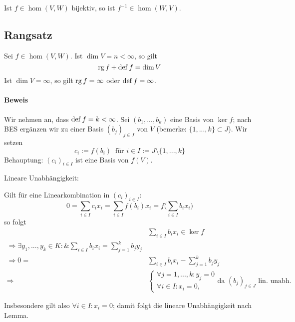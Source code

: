  		Ist $ f\in \hom (V,W) $ bijektiv, so ist $ f^{-1}\in \hom (W,V) $.

 \subsection{Rangsatz}
 	\begin{Satz}[Rangsatz]
 		Sei $ f\in \hom (V,W) $. Ist $ \dim V = n < \infty $,  so gilt
 		\[
 			\operatorname{rg} f + \operatorname{def} f = \dim V
 		\]
 		Ist $ \dim V = \infty $, so gilt $ \operatorname{rg} f = \infty $ oder $ \operatorname{def} f = \infty $.
 	\end{Satz}

 	\paragraph{Beweis}
 		Wir nehmen an, dass $ \operatorname{def} f = k < \infty $.
 		Sei $ (b_1,...,b_k) $ eine Basis von $ \ker f $;
 		nach BES ergänzen wir zu einer Basis $ (b_j)_{j\in J} $ von $ V $ (bemerke: $ \{1,...,k\}\subset J $).
 		Wir setzen
 		\[
 			c_i:=f(b_i)\ \text{ für } i\in I:=J\setminus \{1,...,k\}
 		\]
 		Behauptung: $(c_i)_{i\in I}$ ist eine Basis von $f(V)$.

 		Lineare Unabhängigkeit:
 		\begin{addmargin}[25pt]{0pt}
 			Gilt für eine Linearkombination in $(c_i)_{i\in I}$:
 			\[
 				0=\sum_{i\in I}c_ix_i = \sum_{i\in I}f(b_i)x_i = f\Big(\sum_{i\in I}b_ix_i\Big)
 			\]
 			so folgt
 			\begin{align*}
 				                                       & \sum_{i\in I}b_ix_i \in \ker f             \\
 				\Rightarrow \exists y_1,...,y_k\in K:\&\sum_{i\in I}b_ix_i=\sum_{j=1}^{k}b_jy_j &                                            \\
 				\Rightarrow 0 =                        & \sum_{i\in I}b_ix_i - \sum_{j=1}^{k}b_jy_j \\
 				\Rightarrow                            &
 				\begin{cases}
 				\forall j = 1, ... ,k:y_j=0\\
 				\forall i\in I: x_i = 0,
 				\end{cases}
 				\text{da $(b_j)_{j\in J}$ lin. unabh.}
 			\end{align*}

 			Insbesondere gilt also $\forall i\in I: x_i = 0$; damit folgt die lineare Unabhängigkeit nach Lemma.
 		\end{addmargin}

